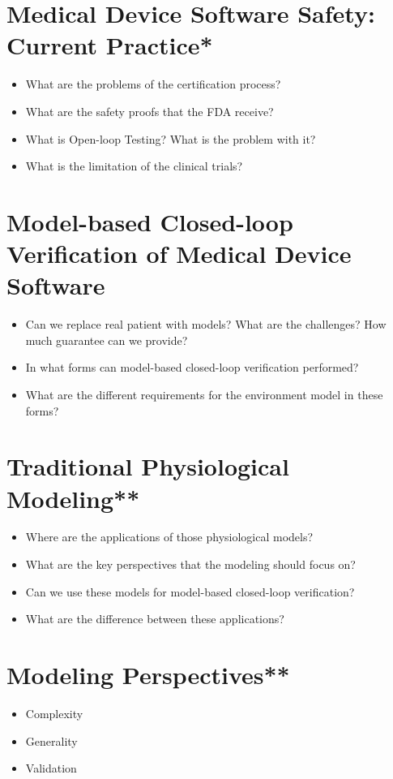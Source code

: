 \documentclass[openany]{now} %
\begin{document}
\section{Medical Device Software Safety: Current Practice*}
\begin{itemize}
    \item What are the problems of the certification process?
    \item What are the safety proofs that the FDA receive?
    \item What is Open-loop Testing? What is the problem with it?
    \item What is the limitation of the clinical trials?
    
\end{itemize}

\section{Model-based Closed-loop Verification of Medical Device Software}
\begin{itemize}
	\item Can we replace real patient with models? What are the challenges? How much guarantee can we provide?
    \item In what forms can model-based closed-loop verification performed?
    \item What are the different requirements for the environment model in these forms?
\end{itemize}

\section{Traditional Physiological Modeling**}
\begin{itemize}
	\item Where are the applications of those physiological models?
    \item What are the key perspectives that the modeling should focus on?
    \item Can we use these models for model-based closed-loop verification?
    \item What are the difference between these applications?
\end{itemize}

\section{Modeling Perspectives**}
\begin{itemize}
	\item Complexity
    \item Generality
    \item Validation
\end{itemize}
\end{document}
